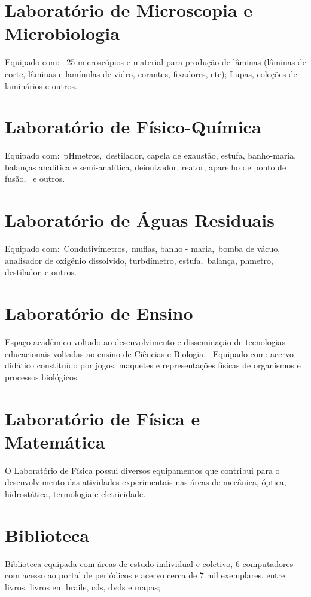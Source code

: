 \documentclass[11pt,fleqn]{book} %
\begin{document}
\section{Laboratório de Microscopia e Microbiologia}
Equipado com:  25 microscópios e material para produção de lâminas (lâminas de corte, lâminas e lamínulas de vidro, corantes, fixadores, etc); Lupas, coleções de laminários e outros.

\section{Laboratório de Físico-Química}
Equipado com: pHmetros, destilador, capela de exaustão, estufa, banho-maria, balanças analítica e semi-analítica, deionizador, reator, aparelho de ponto de fusão,  e outros.

\section{Laboratório de Águas Residuais}
Equipado com: Condutivímetros, muflas, banho - maria, bomba de vácuo, analisador de oxigênio dissolvido, turbdímetro, estufa, balança, phmetro, destilador e outros.

\section{Laboratório de Ensino}
Espaço acadêmico voltado ao desenvolvimento e disseminação de tecnologias educacionais voltadas ao ensino de Ciências e Biologia.  Equipado com: acervo didático constituído por jogos, maquetes e representações físicas de organismos e processos biológicos.

\section{Laboratório de Física e Matemática}
O Laboratório de Física possui diversos equipamentos que contribui para o desenvolvimento das atividades experimentais nas áreas de mecânica, óptica, hidrostática, termologia e eletricidade.

\section{Biblioteca}
Biblioteca equipada com áreas de estudo individual e coletivo, 6 computadores com acesso ao portal de periódicos e acervo cerca de 7 mil exemplares, entre livros, livros em braile, cds, dvds e mapas;
\end{document}
